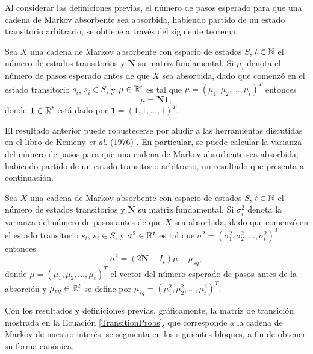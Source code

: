 Al considerar las definiciones previas, el número de pasos esperado para que una cadena de Markov absorbente sea absorbida, habiendo partido de un estado transitorio arbitrario, se obtiene a través del siguiente teorema.


\begin{theorem}
	Sea $X$ una cadena de Markov absorbente con espacio de estados $S$, $t\in \mathbb{N}$ el número de estados transitorios y $\mathbf{N}$ su matriz fundamental. Si $\mu_i$ denota el número de pasos esperado antes de que $X$ sea absorbida, dado que comenzó en el estado transitorio $s_i$, $s_i\in S$, y $\mu\in \mathbb{R}^t$ es tal que $\mu=(\mu_1, \mu_2,\ldots, \mu_t)^T$  entonces \begin{equation}
	\mu = \mathbf{N} \mathbf{1},
	\end{equation}donde $\mathbf{1}\in\mathbb{R}^{t}$ está dado por $\mathbf{1}=(1,1,\ldots,1)^T$.\label{mu} 
\end{theorem} 

El resultado anterior puede robustecerse por aludir a las herramientas discutidas en el libro de Kemeny \textit{et al.} (1976) \cite[Capítulo 3]{Kemeny_1976}. En particular, se puede calcular la varianza del número de pasos para que una cadena de Markov absorbente sea absorbida, habiendo partido de un estado transitorio arbitrario, un resultado que presenta a continuación.\\

\begin{theorem}
	Sea $X$ una cadena de Markov absorbente con espacio de estados $S$, $t\in \mathbb{N}$ el número de estados transitorios y $\mathbf{N}$ su matriz fundamental. Si $\sigma^2_i$ denota la varianza del número de pasos antes de que $X$ sea absorbida, dado que comenzó en el estado transitorio $s_i$, $s_i\in S$, y $\sigma^2\in \mathbb{R}^t$ es tal que $\sigma^2=(\sigma^2_1, \sigma^2_2,\ldots, \sigma^2_t)^T$ entonces  \begin{equation}
		\sigma^2 = (2\mathbf{N} - I_t)\mu -  \mu_{sq},
	\end{equation}donde $\mu=(\mu_1,\mu_2,\ldots,\mu_t)^T$ el vector del número esperado de pasos antes de la absorción y $\mu_{sq}\in \mathbb{R}^{t}$ se define por $\mu_{sq}=(\mu^2_1,\mu^2_2,\ldots,\mu^2_t)^T$.
	\label{sigma_sq}
\end{theorem}

Con los resultados y definiciones previas, gráficamente, la matriz de transición mostrada en la Ecuación \eqref{TransitionProbs}, que corresponde a la cadena de Markov de nuestro interés, se segmenta en los siguientes bloques, a fin de obtener su forma canónica. 

